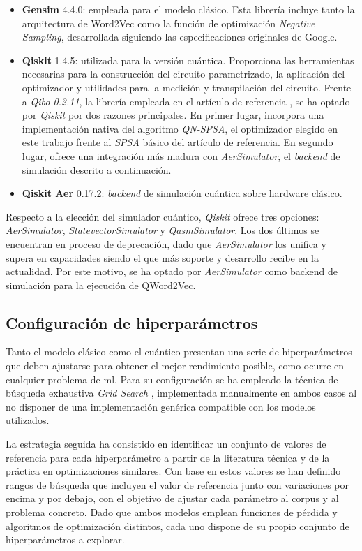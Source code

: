 \begin{itemize}
  \item \textbf{Gensim} 4.4.0: empleada para el modelo clásico. Esta librería incluye tanto la arquitectura de Word2Vec como la función de optimización \textit{Negative Sampling}, desarrollada siguiendo las especificaciones originales de Google.
  \item \textbf{Qiskit} 1.4.5: utilizada para la versión cuántica. Proporciona las herramientas necesarias para la construcción del circuito parametrizado, la aplicación del optimizador y utilidades para la medición y transpilación del circuito. Frente a \textit{Qibo 0.2.11}, la librería empleada en el artículo de referencia \cite{ohno_qword2vec_2025}, se ha optado por \textit{Qiskit} por dos razones principales. En primer lugar, incorpora una implementación nativa del algoritmo \textit{QN-SPSA}, el optimizador elegido en este trabajo frente al \textit{SPSA} básico del artículo de referencia. En segundo lugar, ofrece una integración más madura con \textit{AerSimulator}, el \textit{backend} de simulación descrito a continuación.
  \item \textbf{Qiskit Aer} 0.17.2: \textit{backend} de simulación cuántica sobre hardware clásico.
\end{itemize}

Respecto a la elección del simulador cuántico, \textit{Qiskit} ofrece tres opciones: \textit{AerSimulator}, \textit{StatevectorSimulator} y \textit{QasmSimulator}. Los dos últimos se encuentran en proceso de deprecación, dado que \textit{AerSimulator} los unifica y supera en capacidades siendo el que más soporte y desarrollo recibe en la actualidad. Por este motivo, se ha optado por \textit{AerSimulator} como backend de simulación para la ejecución de QWord2Vec.

\subsection{Configuración de hiperparámetros}

Tanto el modelo clásico como el cuántico presentan una serie de hiperparámetros que deben ajustarse para obtener el mejor rendimiento posible, como ocurre en cualquier problema de \gls{ml}. Para su configuración se ha empleado la técnica de búsqueda exhaustiva \textit{Grid Search} \cite{dremio_grid_2026}, implementada manualmente en ambos casos al no disponer de una implementación genérica compatible con los modelos utilizados.

La estrategia seguida ha consistido en identificar un conjunto de valores de referencia para cada hiperparámetro a partir de la literatura técnica y de la práctica en optimizaciones similares. Con base en estos valores se han definido rangos de búsqueda que incluyen el valor de referencia junto con variaciones por encima y por debajo, con el objetivo de ajustar cada parámetro al corpus y al problema concreto. Dado que ambos modelos emplean funciones de pérdida y algoritmos de optimización distintos, cada uno dispone de su propio conjunto de hiperparámetros a explorar.

